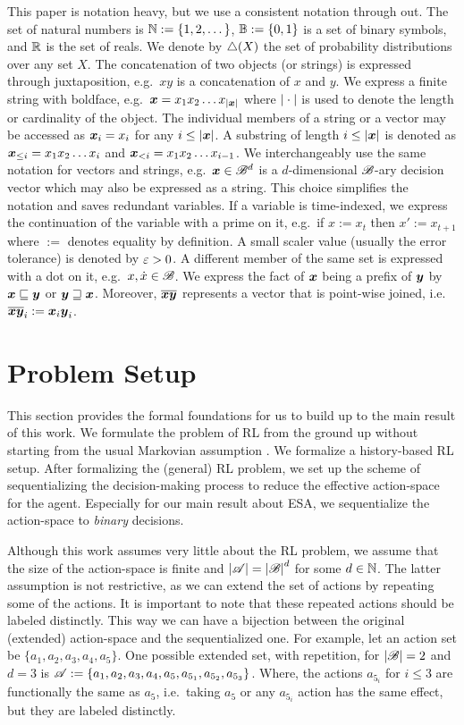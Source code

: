 \documentclass{article} %
\begin{document}
This paper is notation heavy, but we use a consistent notation through out.
The set of natural numbers is $\mathbb{N} := \{1, 2, \dots\}$, $\mathbb{B} := \{0,1\}$ is a set of binary symbols, and $\mathbb{R}$ is the set of reals. We denote by $\triangle(X)$ the set of probability distributions over any set $X$. The concatenation of two objects (or strings) is expressed through juxtaposition, e.g.\ $xy$ is a concatenation of $x$ and $y$. We express a finite string with boldface, e.g.\ $\boldsymbol{x} = x_1 x_2 \dots x_{{\left\lvert\boldsymbol{x}\right\rvert}}$ where ${\left\lvert{}\cdot{}\right\rvert}$ is used to denote the length or cardinality of the object. The individual members of a string or a vector may be accessed as $\boldsymbol{x}_i = x_i$ for any $i \leq {\left\lvert\boldsymbol{x}\right\rvert}$. A substring of length $i \leq {\left\lvert\boldsymbol{x}\right\rvert}$ is denoted as $\boldsymbol{x}_{\leq i} = x_1x_2\dots x_{i}$ and $\boldsymbol{x}_{<i} = x_1x_2\dots x_{i-1}$. We interchangeably use the same notation for vectors and strings, e.g.\ $\boldsymbol{x} \in \mathscr{B}^d$ is a $d$-dimensional $\mathscr{B}$-ary decision vector which may also be expressed as a string. This choice simplifies the notation and saves redundant variables. If a variable is time-indexed, we express the continuation of the variable with a prime on it, e.g.\ if $x := x_{t}$ then $x' := x_{t+1}$ where $:=$ denotes equality by definition. A small scaler value (usually the error tolerance) is denoted by $\varepsilon > 0$.
A different member of the same set is expressed with a dot on it, e.g.\ $x, \dot{x} \in \mathscr{B}$. We express the fact of $\boldsymbol{x}$ being a prefix of $\boldsymbol{y}$ by $\boldsymbol{x} \sqsubseteq \boldsymbol{y}$ or $\boldsymbol{y} \sqsupseteq \boldsymbol{x}$. Moreover, $\boldsymbol{\overline{xy}}$ represents a vector that is point-wise joined, i.e.\ $\boldsymbol{\overline{xy}}_i := \boldsymbol{x}_i \boldsymbol{y}_i$.

\section{Problem Setup}\label{sec:setup}

This section provides the formal foundations for us to build up to the main result of this work. We formulate the problem of RL from the ground up without starting from the usual Markovian assumption \cite{Sutton2018}. We formalize a history-based RL setup. After formalizing the (general) RL problem, we set up the scheme of sequentializing the decision-making process to reduce the effective action-space for the agent. Especially for our main result about ESA, we sequentialize the action-space to \emph{binary} decisions.


Although this work assumes very little about the RL problem, we assume that the size of the action-space is finite and ${\left\lvert\mathscr{A}\right\rvert} = {\left\lvert\mathscr{B}\right\rvert}^d$ for some $d \in \mathbb{N}$. The latter assumption is not restrictive, as we can extend the set of actions by repeating some of the actions. It is important to note that these repeated actions should be labeled distinctly. This way we can have a bijection between the original (extended) action-space and the sequentialized one. For example, let an action set be $\{a_1,a_2,a_3,a_4,a_5\}$. One possible extended set, with repetition, for ${\left\lvert\mathscr{B}\right\rvert} = 2$ and $d = 3$ is $\mathscr{A} := \{a_1,a_2,a_3,a_4,a_5,a_{5_1},a_{5_2},a_{5_3}\}$. Where, the actions $a_{5_i}$ for $i \leq 3$ are functionally the same as $a_5$, i.e.\ taking $a_5$ or any $a_{5_i}$ action has the same effect, but they are labeled distinctly.
\end{document}
